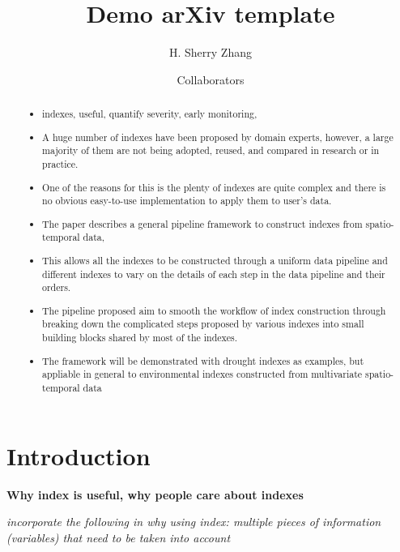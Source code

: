 \documentclass[
  letterpaper,
  DIV=11,
  numbers=noendperiod]{scrartcl}
\title{Demo arXiv template}
\author{H. Sherry Zhang \and Collaborators}
\date{}
\providecommand{\tightlist}{%
  \setlength{\itemsep}{0pt}\setlength{\parskip}{0pt}}\usepackage{longtable,booktabs,array}
\begin{document}
\maketitle
\begin{abstract}
\begin{itemize}
\tightlist
\item
  indexes, useful, quantify severity, early monitoring,
\item
  A huge number of indexes have been proposed by domain experts,
  however, a large majority of them are not being adopted, reused, and
  compared in research or in practice.
\item
  One of the reasons for this is the plenty of indexes are quite complex
  and there is no obvious easy-to-use implementation to apply them to
  user's data.
\item
  The paper describes a general pipeline framework to construct indexes
  from spatio-temporal data,
\item
  This allows all the indexes to be constructed through a uniform data
  pipeline and different indexes to vary on the details of each step in
  the data pipeline and their orders.
\item
  The pipeline proposed aim to smooth the workflow of index construction
  through breaking down the complicated steps proposed by various
  indexes into small building blocks shared by most of the indexes.
\item
  The framework will be demonstrated with drought indexes as examples,
  but appliable in general to environmental indexes constructed from
  multivariate spatio-temporal data
\end{itemize}
\end{abstract}
\ifdefined\Shaded\renewenvironment{Shaded}{\begin{tcolorbox}[frame hidden, boxrule=0pt, borderline west={3pt}{0pt}{shadecolor}, sharp corners, interior hidden, enhanced, breakable]}{\end{tcolorbox}}\fi

\hypertarget{introduction}{%
\section{Introduction}\label{introduction}}

\textbf{Why index is useful, why people care about indexes}

\emph{incorporate the following in why using index: multiple pieces of
information (variables) that need to be taken into account}
\end{document}
